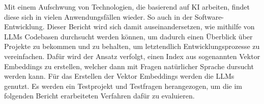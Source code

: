 \documentclass[../main.tex]{subfiles}
\begin{document}
Mit einem Aufschwung von Technologien, die basierend auf \gls{KI} arbeiten, findet diese sich in vielen Anwendungsfällen wieder.
So auch in der Software-Entwicklung.
Dieser Bericht wird sich damit auseinandersetzen, wie mithilfe von \glspl{LLM} Codebasen durchsucht werden können, um dadurch einen Überblick über Projekte zu bekommen und zu behalten, um letztendlich Entwicklungsprozesse zu vereinfachen.
Dafür wird der Ansatz verfolgt, einen Index aus sogenannten Vektor Embeddings zu erstellen, welcher dann mit Fragen natürlicher Sprache dursucht werden kann.
Für das Erstellen der Vektor Embeddings werden die \glspl{LLM} genutzt.
Es werden ein Testprojekt und Testfragen herangezogen, um die im folgenden Bericht erarbeiteten Verfahren dafür zu evaluieren.
\end{document}
